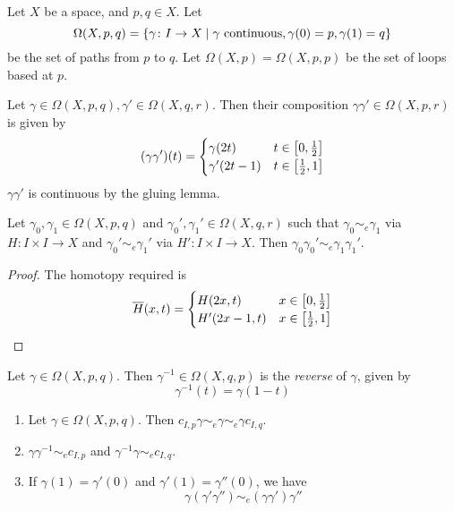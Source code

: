 \begin{definition}
	Let \( X \) be a space, and \( p, q \in X \).
	Let
	\[ \Omega(X,p,q) = \qty{\gamma \colon I \to X \mid \gamma \text{ continuous}, \gamma(0) = p, \gamma(1) = q} \]
	be the set of paths from \( p \) to \( q \).
	Let \( \Omega(X,p) = \Omega(X,p,p) \) be the set of loops based at \( p \).
\end{definition}
\begin{definition}
	Let \( \gamma \in \Omega(X,p,q), \gamma' \in \Omega(X,q,r) \).
	Then their composition \( \gamma \gamma' \in \Omega(X,p,r) \) is given by
	\[ (\gamma\gamma')(t) = \begin{cases}
		\gamma(2t) & t \in \qty[0,\frac 12] \\
		\gamma'(2t-1) & t \in \qty[\frac 12, 1]
	\end{cases} \]
	\( \gamma\gamma' \) is continuous by the gluing lemma.
\end{definition}
\begin{lemma}
	Let \( \gamma_0, \gamma_1 \in \Omega(X,p,q) \) and \( \gamma_0', \gamma_1' \in \Omega(X,q,r) \) such that \( \gamma_0 \sim_e \gamma_1 \) via \( H \colon I \times I \to X \) and \( \gamma_0' \sim_e \gamma_1' \) via \( H' \colon I \times I \to X \).
	Then \( \gamma_0 \gamma_0' \sim_e \gamma_1 \gamma_1' \).
\end{lemma}
\begin{proof}
	The homotopy required is
	\[ \overline H(x,t) = \begin{cases}
		H(2x,t) & x \in \qty[0,\frac 12] \\
		H'(2x-1,t) & x \in \qty[\frac 12, 1]
	\end{cases} \]
\end{proof}
\begin{definition}
	Let \( \gamma \in \Omega(X,p,q) \).
	Then \( \gamma^{-1} \in \Omega(X,q,p) \) is the \emph{reverse} of \( \gamma \), given by
	\[ \gamma^{-1}(t) = \gamma(1-t) \]
\end{definition}
\begin{proposition}
	\begin{enumerate}
		\item Let \( \gamma \in \Omega(X,p,q) \).
			Then \( c_{I,p} \gamma \sim_e \gamma \sim_e \gamma c_{I,q} \).
		\item \( \gamma \gamma^{-1} \sim_e c_{I,p} \) and \( \gamma^{-1} \gamma \sim_e c_{I,q} \).
		\item If \( \gamma(1) = \gamma'(0) \) and \( \gamma'(1) = \gamma''(0) \), we have
			\[ \gamma (\gamma' \gamma'') \sim_e (\gamma \gamma') \gamma'' \]
	\end{enumerate}
\end{proposition}
